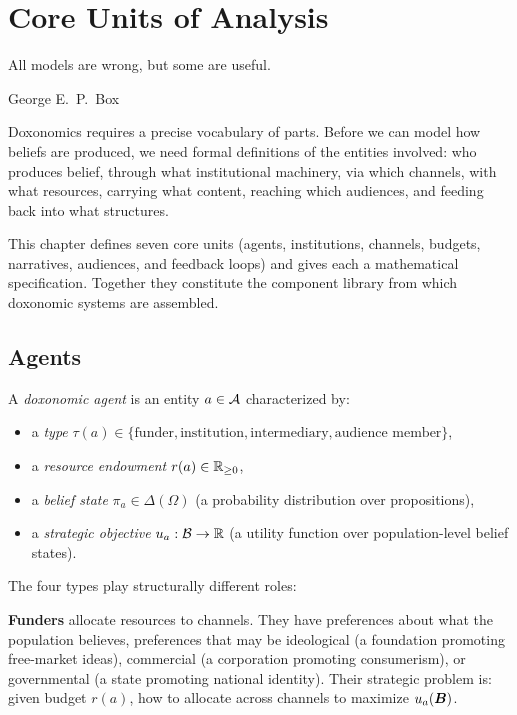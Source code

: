 \chapter{Core Units of Analysis}
\label{ch:core-units}

\epigraph{All models are wrong, but some are useful.}{George E.\ P.\ Box}

\noindent
Doxonomics requires a precise vocabulary of parts.
Before we can model how beliefs are produced, we need formal definitions of the entities involved: who produces belief, through what institutional machinery, via which channels, with what resources, carrying what content, reaching which audiences, and feeding back into what structures.

This chapter defines seven core units (agents, institutions, channels, budgets, narratives, audiences, and feedback loops) and gives each a mathematical specification.
Together they constitute the component library from which doxonomic systems are assembled.


\section{Agents}
\label{sec:ch4-agents}

\begin{definition}
\label{def:agent}
A \emph{doxonomic agent} is an entity $a \in \mathcal{A}$ characterized by:
\begin{itemize}[nosep]
  \item a \emph{type} $\tau(a) \in \{\text{funder}, \text{institution}, \text{intermediary}, \text{audience member}\}$,
  \item a \emph{resource endowment} $r(a) \in \mathbb{R}_{\geq 0}$,
  \item a \emph{belief state} $\pi_a \in \Delta(\Omega)$ (a probability distribution over propositions),
  \item a \emph{strategic objective} $u_a: \mathcal{B} \to \mathbb{R}$ (a utility function over population-level belief states).
\end{itemize}
\end{definition}

The four types play structurally different roles:

\textbf{Funders} allocate resources to channels.
They have preferences about what the population believes, preferences that may be ideological (a foundation promoting free-market ideas), commercial (a corporation promoting consumerism), or governmental (a state promoting national identity).
Their strategic problem is: given budget $r(a)$, how to allocate across channels to maximize $u_a(\bm{B})$.

